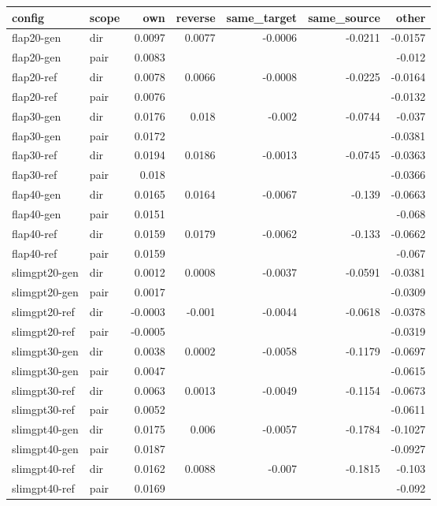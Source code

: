 \begin{tabular}{llrrrrr}
\toprule
config & scope & own & reverse & same_target & same_source & other \\
\midrule
flap20-gen & dir & 0.0097 & 0.0077 & -0.0006 & -0.0211 & -0.0157 \\
flap20-gen & pair & 0.0083 &  &  &  & -0.012 \\
flap20-ref & dir & 0.0078 & 0.0066 & -0.0008 & -0.0225 & -0.0164 \\
flap20-ref & pair & 0.0076 &  &  &  & -0.0132 \\
flap30-gen & dir & 0.0176 & 0.018 & -0.002 & -0.0744 & -0.037 \\
flap30-gen & pair & 0.0172 &  &  &  & -0.0381 \\
flap30-ref & dir & 0.0194 & 0.0186 & -0.0013 & -0.0745 & -0.0363 \\
flap30-ref & pair & 0.018 &  &  &  & -0.0366 \\
flap40-gen & dir & 0.0165 & 0.0164 & -0.0067 & -0.139 & -0.0663 \\
flap40-gen & pair & 0.0151 &  &  &  & -0.068 \\
flap40-ref & dir & 0.0159 & 0.0179 & -0.0062 & -0.133 & -0.0662 \\
flap40-ref & pair & 0.0159 &  &  &  & -0.067 \\
slimgpt20-gen & dir & 0.0012 & 0.0008 & -0.0037 & -0.0591 & -0.0381 \\
slimgpt20-gen & pair & 0.0017 &  &  &  & -0.0309 \\
slimgpt20-ref & dir & -0.0003 & -0.001 & -0.0044 & -0.0618 & -0.0378 \\
slimgpt20-ref & pair & -0.0005 &  &  &  & -0.0319 \\
slimgpt30-gen & dir & 0.0038 & 0.0002 & -0.0058 & -0.1179 & -0.0697 \\
slimgpt30-gen & pair & 0.0047 &  &  &  & -0.0615 \\
slimgpt30-ref & dir & 0.0063 & 0.0013 & -0.0049 & -0.1154 & -0.0673 \\
slimgpt30-ref & pair & 0.0052 &  &  &  & -0.0611 \\
slimgpt40-gen & dir & 0.0175 & 0.006 & -0.0057 & -0.1784 & -0.1027 \\
slimgpt40-gen & pair & 0.0187 &  &  &  & -0.0927 \\
slimgpt40-ref & dir & 0.0162 & 0.0088 & -0.007 & -0.1815 & -0.103 \\
slimgpt40-ref & pair & 0.0169 &  &  &  & -0.092 \\
\bottomrule
\end{tabular}
